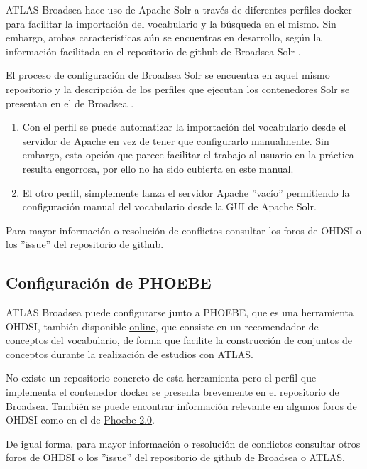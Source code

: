 ATLAS Broadsea hace uso de Apache Solr a través de diferentes perfiles docker para facilitar la importación del vocabulario y la búsqueda en el mismo. Sin embargo, ambas características aún se encuentras en desarrollo, según la información facilitada en el repositorio de github de Broadsea Solr \parencite{githubBroadseaSolr}.

El proceso de configuración de Broadsea Solr se encuentra en aquel mismo repositorio y la descripción de los perfiles que ejecutan los contenedores Solr se presentan en el de Broadsea \parencite{githubBroadsea}. 

\begin{enumerate}
    \item Con el perfil  se puede automatizar la importación del vocabulario desde el servidor de Apache en vez de tener que configurarlo manualmente. Sin embargo, esta opción que parece facilitar el trabajo al usuario en la práctica resulta engorrosa, por ello no ha sido cubierta en este manual.
    \item El otro perfil,  simplemente lanza el servidor Apache ''vacío'' permitiendo la configuración manual del vocabulario desde la GUI de Apache Solr.
\end{enumerate}

Para mayor información o resolución de conflictos consultar los foros de OHDSI o los ''issue'' del repositorio de github.

\subsection{Configuración de PHOEBE} \label{subsec:05phoebe}

ATLAS Broadsea puede configurarse junto a PHOEBE, que es una herramienta OHDSI, también disponible \href{https://data.ohdsi.org/PHOEBE/}{online}, que consiste en un recomendador de conceptos del vocabulario, de forma que facilite la construcción de conjuntos de conceptos durante la realización de estudios con ATLAS. 

No existe un repositorio concreto de esta herramienta pero el perfil que implementa el contenedor docker se presenta brevemente en el repositorio de \href{https://github.com/OHDSI/Broadsea}{Broadsea}. También se puede encontrar información relevante en algunos foros de OHDSI como en el de \href{https://forums.ohdsi.org/t/phoebe-2-0/17410}{Phoebe 2.0}.

De igual forma, para mayor información o resolución de conflictos consultar otros foros de OHDSI o los ''issue'' del repositorio de github de Broadsea o ATLAS.
